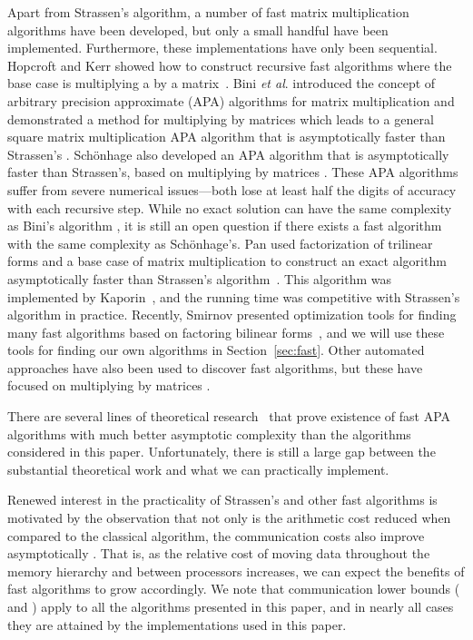 \documentclass[preprint]{sigplanconf}
\begin{document}
Apart from Strassen's algorithm, a number of fast matrix multiplication algorithms have been developed,
but only a small handful have been implemented.
Furthermore, these implementations have only been sequential.
Hopcroft and Kerr showed how to construct recursive fast algorithms where the base case is multiplying a  by a  matrix~\cite{hopcroft1971minimizing}.
Bini \emph{et al}. introduced the concept of arbitrary precision approximate (APA) algorithms for matrix multiplication and demonstrated a method for multiplying  by  matrices which leads to a general square matrix multiplication APA algorithm that is asymptotically faster than Strassen's \cite{BCRL79}.
Sch\"{o}nhage also developed an APA algorithm that is asymptotically faster than Strassen's, based on multiplying  by  matrices \cite{Schonhage81}.
These APA algorithms suffer from severe numerical issues---both lose at least half the digits of accuracy with each recursive step.
While no exact solution can have the same complexity as Bini's algorithm \cite{hopcroft1971minimizing},
it is still an open question if there exists a fast algorithm with the same complexity as Sch\"{o}nhage's.
Pan used factorization of trilinear forms and a base case of  matrix multiplication to construct an exact algorithm asymptotically faster than Strassen's algorithm~\cite{pan1978strassen}.
This algorithm was implemented by Kaporin~\cite{kaporin2004aggregation}, and the running time was competitive with Strassen's algorithm in practice.
Recently, Smirnov presented optimization tools for finding many fast algorithms based on factoring bilinear forms~\cite{smirnov2013bilinear},
and we will use these tools for finding our own algorithms in Section~\ref{sec:fast}.
Other automated approaches have also been used to discover fast algorithms, but these have focused on multiplying  by  matrices \cite{JM86,CBH11,OKM13}.

There are several lines of theoretical research~\cite{coppersmith1990matrix, stothers2010complexity, williams2012multiplying} that prove existence of fast APA algorithms with much better asymptotic complexity than the algorithms considered in this paper.
Unfortunately, there is still a large gap between the substantial theoretical work and what we can practically implement.

Renewed interest in the practicality of Strassen's and other fast algorithms is motivated by the observation that not only is the arithmetic cost reduced when compared to the classical algorithm, the communication costs also improve asymptotically \cite{ballard2012graph}.
That is, as the relative cost of moving data throughout the memory hierarchy and between processors increases, we can expect the benefits of fast algorithms to grow accordingly.
We note that communication lower bounds (\cite[Theorem 1.4]{ballard2012graph} and \cite[Theorem 1]{BDHLS12-RECT}) apply to all the algorithms presented in this paper, and in nearly all cases they are attained by the implementations used in this paper.
\end{document}
